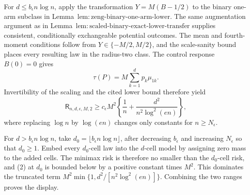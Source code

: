 For \(d\le b_{\epsilon}n\log n\), apply the transformation \(Y=M(B-1/2)\) to the binary one-arm subclass in Lemma~\(\mathrm{lem:zeng\text{-}binary\text{-}one\text{-}arm\text{-}lower}\).  The same augmentation argument as in Lemma~\(\mathrm{lem:scaled\text{-}binary\text{-}exact\text{-}lower\text{-}transfer}\) supplies consistent, conditionally exchangeable potential outcomes.  The mean and fourth-moment conditions follow from \(Y\in\{-M/2,M/2\}\), and the scale-sanity bound places every resulting law in the radius-two class.  The control response \(B(0)=0\) gives
\[
 \tau(P)=M\sum_{k=1}^dp_k\mu_{1k}.
\tag{1}
\]
Invertibility of the scaling and the cited lower bound therefore yield
\[
 \mathsf R_{n,d,\epsilon,M,2}
 \ge c_{\epsilon}M^2\left\{\frac1n+\frac{d^2}{n^2\log^2(en)}\right\},
\tag{2}
\]
where replacing \(\log n\) by \(\log(en)\) changes only constants for \(n\ge N_{\epsilon}\).

For \(d>b_{\epsilon}n\log n\), take \(d_0=\lfloor b_{\epsilon}n\log n\rfloor\), after decreasing \(b_{\epsilon}\) and increasing \(N_{\epsilon}\) so that \(d_0\ge1\).  Embed every \(d_0\)-cell law into the \(d\)-cell model by assigning zero mass to the added cells.  The minimax risk is therefore no smaller than the \(d_0\)-cell risk, and (2) at \(d_0\) is bounded below by a positive constant times \(M^2\).  This dominates the truncated term \(M^2\min\{1,d^2/[n^2\log^2(en)]\}\).  Combining the two ranges proves the display.